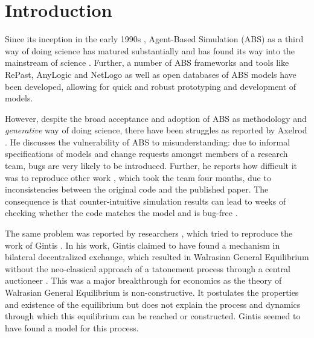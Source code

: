 \section{Introduction}
\label{sec:introduction}
Since its inception in the early 1990s \cite{epstein_growing_1996,siebers_introduction_2008,wooldridge_introduction_2009}, Agent-Based Simulation (ABS) as a third way of doing science \cite{axelrod_advancing_1997,axelrod_guide_2006} has matured substantially and has found its way into the mainstream of science \cite{macal_everything_2016}. Further, a number of ABS frameworks and tools like RePast, AnyLogic and NetLogo as well as open databases of ABS models \cite{openabm_model_database}
have been developed, allowing for quick and robust prototyping and development of models.  

However, despite the broad acceptance and adoption of ABS as methodology and \textit{generative} way of doing science, there have been struggles as reported by Axelrod \cite{axelrod_chapter_2006}. He discusses the vulnerability of ABS to misunderstanding: due to informal specifications of models and change requests amongst members of a research team, bugs are very likely to be introduced. Further, he reports how difficult it was to reproduce other work \cite{axelrod_convergence_1995}, which took the team four months, due to inconsistencies between the original code and the published paper. The consequence is that counter-intuitive simulation results can lead to weeks of checking whether the code matches the model and is bug-free \cite{axelrod_advancing_1997}.

The same problem was reported by researchers \cite{ionescu_dependently-typed_2012}, which tried to reproduce the work of Gintis \cite{gintis_emergence_2006}. In his work, Gintis claimed to have found a mechanism in bilateral decentralized exchange, which resulted in Walrasian General Equilibrium without the neo-classical approach of a tatonement process through a central auctioneer \cite{colell_microeconomic_1995}. This was a major breakthrough for economics as the theory of Walrasian General Equilibrium is non-constructive. It postulates the properties and existence of the equilibrium but does not explain the process and dynamics through which this equilibrium can be reached or constructed. Gintis seemed to have found a model for this process.

